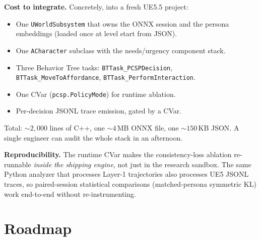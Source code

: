 \documentclass[11pt]{article}
\begin{document}
\noindent\textbf{Cost to integrate.}
Concretely, into a fresh UE5.5 project:
\begin{itemize}[leftmargin=*,nosep]
\item One \texttt{UWorldSubsystem} that owns the ONNX session and the
persona embeddings (loaded once at level start from JSON).
\item One \texttt{ACharacter} subclass with the needs/urgency
component stack.
\item Three Behavior Tree tasks: \texttt{BTTask\_PCSPDecision},
\texttt{BTTask\_MoveToAffordance}, \texttt{BTTask\_PerformInteraction}.
\item One CVar (\texttt{pcsp.PolicyMode}) for runtime ablation.
\item Per-decision JSONL trace emission, gated by a CVar.
\end{itemize}
Total: $\sim\!2{,}000$ lines of C++, one $\sim\!4$\,MB ONNX file, one
$\sim\!150$\,KB JSON. A single engineer can audit the whole stack in
an afternoon.

\noindent\textbf{Reproducibility.}
The runtime CVar makes the consistency-loss ablation re-runnable
\emph{inside the shipping engine}, not just in the research
sandbox. The same Python analyzer that processes Layer-1 trajectories
also processes UE5 JSONL traces, so paired-session statistical
comparisons (matched-persona symmetric KL) work end-to-end without
re-instrumenting.

\section{Roadmap}
\label{sec:roadmap}
\end{document}
